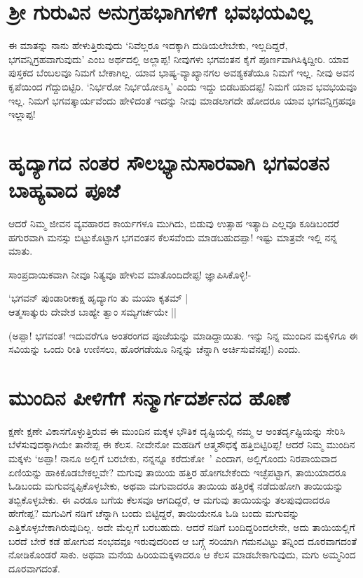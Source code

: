 \section*{ಶ್ರೀ ಗುರುವಿನ ಅನುಗ್ರಹಭಾಗಿಗಳಿಗೆ ಭವಭಯವಿಲ್ಲ}

ಈ ಮಾತನ್ನು ನಾನು ಹೇಳುತ್ತಿರುವುದು `ನಿವೆಲ್ಲರೂ ಇದಕ್ಕಾಗಿ ದುಡಿಯಲೇಬೇಕು, ಇಲ್ಲದಿದ್ದರೆ, ಭಗವನ್ನಿಗ್ರಹವಾಗುವುದು' ಎಂಬ ಅರ್ಥದಲ್ಲಿ ಅಲ್ಲಾಪ್ಪ! ನೀವುಗಳು ಭಗವಂತನ ಕೈಗೆ ಪೂರ್ಣವಾಗಿಸಿಕ್ಕಿದ್ದೀರಿ. ಯಾವ ಪುಸ್ತಕದ ಬೆಂಬಲವೂ ನಿಮಗೆ ಬೇಕಾಗಿಲ್ಲ. ಯಾವ ಭಾಷ್ಯ-ವ್ಯಾಖ್ಯಾನಗಲ ಅವಶ್ಯಕತೆಯೂ ನಿಮಗೆ ಇಲ್ಲ. ನೀವು ಅವನ ಕೃಪೆಯಿಂದ ಗೆದ್ದುಬಿಟ್ಟಿರಿ. `ನಿರ್ಭರೋ ನಿರ್ಭಯೋಽಸ್ಮಿ' ಎಂದು ಇದ್ದು ಬಿಡಬಹುದಪ್ಪ! ನಿಮಗೆ ಯಾವ ಭವಭಯವೂ ಇಲ್ಲ. ನಿಮಗೆ ಭಗವತ್ಕಾರ್ಯವೆಂದು ಹೇಳಿದಂತೆ ಇದನ್ನು ನೀವು ಮಾಡಲಾಗದೇ ಹೋದರೂ ಯಾವ ಭಗವನ್ನಿಗ್ರಹವೂ ಇಲ್ಲಾಪ್ಪ!

\section*{ಹೃದ್ಯಾಗದ ನಂತರ ಸೌಲಭ್ಯಾನುಸಾರವಾಗಿ ಭಗವಂತನ ಬಾಹ್ಯವಾದ ಪೂಜೆ}

ಆದರೆ ನಿಮ್ಮ ಜೀವನ ವ್ಯವಹಾರದ ಕಾರ್ಯಗಳೂ ಮುಗಿದು, ಬಿಡುವು ಉತ್ಸಾಹ ಇತ್ಯಾದಿ ಎಲ್ಲವೂ ಕೂಡಿಬಂದರೆ ಹಗುರವಾಗಿ ಮನಸ್ಸು ಬಿಟ್ಟುಕೊಟ್ಟಾಗ ಭಗವಂತನ ಕೆಲಸವೆಂದು ಮಾಡಬಹುದಪ್ಪಾ! ಇಷ್ಟು ಮಾತ್ರವೇ ಇಲ್ಲಿ ನನ್ನ ಮಾತು.

ಸಾಂಪ್ರದಾಯಿಕವಾಗಿ ನೀವೂ ನಿತ್ಯವೂ ಹೇಳುವ ಮಾತೊಂದಿದೇಪ್ಪ! ಜ್ಞಾಪಿಸಿಕೊಳ್ಳಿ!-

\begin{shloka}
`ಭಗವನ್ ಪುಂಡಾರೀಕಾಕ್ಷ ಹೃದ್ಯಾಗಂ ತು ಮಯಾ ಕೃತಮ್ |\\
ಆತ್ಮಸಾತ್ಕುರು ದೇವೇಶ ಬಾಹ್ಯೇ ತ್ವಾಂ ಸಮ್ಯಗರ್ಚಯೇ ||
\end{shloka}

(ಅಪ್ಪಾ! ಭಗವಂತ! ಇದುವರೆಗೂ ಅಂತರಂಗದ ಪೂಜೆಯನ್ನು ಮಾಡಿದ್ದಾಯಿತು. ಇನ್ನು ನಿನ್ನ ಮುಂದಿನ ಮಕ್ಕಳಿಗೂ ಈ ಸವಿಯನ್ನು ಒಂದು ರೀತಿ ಉಣಿಸಲು, ಹೊರಗಡೆಯೂ ನಿನ್ನನ್ನು ಚೆನ್ನಾಗಿ ಅರ್ಚಿಸುವೆನಪ್ಪ!) ಎಂದು.

\section*{ಮುಂದಿನ ಪೀಳಿಗೆಗೆ ಸನ್ಮಾರ್ಗದರ್ಶನದ ಹೊಣೆ}

ಕ್ಷಣೇ ಕ್ಷಣೇ ವಿಕಾಸಗೊಳ್ಳುತ್ತಿರುವ ಈ ಮುಂದಿನ ಮಕ್ಕಳ ಭೌತಿಕ ದೃಷ್ಟಿಯಲ್ಲಿ ನಮ್ಮ ಆ ಅಂತರ್ದೃಷ್ಟಿಯನ್ನು ಸೇರಿಸಿ ಬೆಳೆಸುವುದಕ್ಕಾಗಿಯೇ ತಾನೇಪ್ಪ ಈ ಕೆಲಸ. ನೀವೇನೋ ಮಹಡಿಗೆ ಆತ್ಮಸೌಧಕ್ಕೆ ಹತ್ತಿಬಿಟ್ಟಿರಿಪ್ಪ! ಆದರೆ ನಿಮ್ಮ ಮುಂದಿನ ಮಕ್ಕಳು `ಅಪ್ಪಾ! ನಾನೂ ಅಲ್ಲಿಗೆ ಬರಬೇಕು, ನನ್ನನ್ನೂ ಕರೆದುಕೋ~' ಎಂದಾಗ, ಅಲ್ಲಿಗೊಂದು ನಿರಪಾಯವಾದ ಏಣಿಯನ್ನು ಹಾಕಿಕೊಡಬೇಕಲ್ಲವೇ? ಮಗುವು ತಾಯಿಯ ಹತ್ತಿರ ಹೋಗಬೇಕೆಂದು ಇಚ್ಛೆಪಟ್ಟಾಗ, ತಾಯಿಯಾದರೂ ಓಡಿಬಂದು ಮಗುವನ್ನಪ್ಪಿಕೊಳ್ಳಬೇಕು, ಅಥವಾ ಮಗುವಾದರೂ ತಾಯಿಯ ಹತ್ತಿರಕ್ಕೆ ನಡೆದುಹೋಗಿ ತಾಯಿಯನ್ನು ತಬ್ಬಿಕೊಳ್ಳಬೇಕು. ಈ ಎರಡೂ ಬಗೆಯ ಕೆಲಸವೂ ಆಗದಿದ್ದರೆ, ಆ ಮಗುವು ತಾಯಿಯನ್ನು ತಲಪುವುದಾದರೂ ಹೇಗೇಪ್ಪ? ಮಗುವಿಗೆ ನಡಿಗೆ ಚೆನ್ನಾಗಿ ಬಂದು ಬಿಟ್ಟಿದ್ದರೆ, ತಾಯಿಯೇನೂ ಓಡಿ ಬಂದು ಮಗುವನ್ನು ಎತ್ತಿಕೊಳ್ಳಬೇಕಾಗಿರುವುದಿಲ್ಲ. ಅದೇ ಮೆಲ್ಲಗೆ ಬರಬಹುದು. ಆದರೆ ನಡಿಗೆ ಬಂದಿದ್ದರಿಂದಲೇನೇ, ಅದು ತಾಯಿಯಲ್ಲಿಗೆ ಬರದೆ ಬೇರೆ ಕಡೆ ಹೋಗುವ ಸಂಭವವೂ ಇರುವುದರಿಂದ ಆ ಬಗ್ಗ್ಗೆ ಸರಿಯಾಗಿ ಗಮನವಿಟ್ಟು ತನ್ನಿಂದ ದೂರವಾಗದಂತೆ ನೋಡಿಕೊಂಡರೆ ಸಾಕು. ಅಥವಾ ಮನೆಯ ಹಿರಿಯಮಕ್ಕಳಾದರೂ ಆ ಕೆಲಸ ಮಾಡಬೇಕಾಗುವುದು, ಮಗು ಅಮ್ಮನಿಂದ ದೂರವಾಗದಂತೆ.

